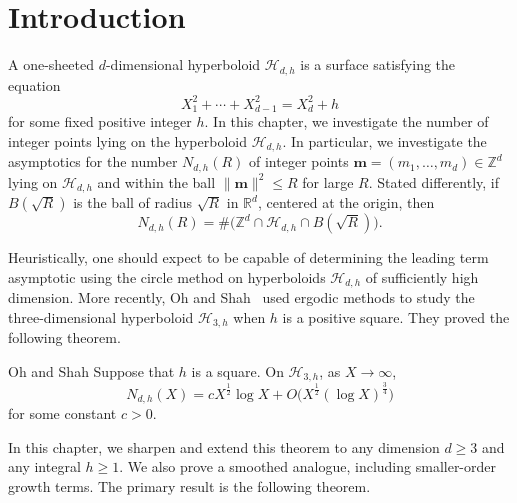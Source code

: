 

\section{Introduction}\label{sec:hyperboloid_introduction}



A one-sheeted $d$-dimensional hyperboloid $\mathcal{H}_{d,h}$ is a surface satisfying the
equation
\begin{equation}
  X_1^2 + \cdots + X_{d-1}^2 = X_d^2 + h
\end{equation}
for some fixed positive integer $h$.
In this chapter, we investigate the number of integer points lying on the hyperboloid
$\mathcal{H}_{d,h}$.
In particular, we investigate the asymptotics for the number $N_{d,h}(R)$ of integer
points $\bm{m} = (m_1, \ldots, m_d) \in \mathbb{Z}^d$ lying on $\mathcal{H}_{d,h}$ and
within the ball $\| \bm{m} \|^2 \leq R$ for large $R$.
Stated differently, if $B(\sqrt{R})$ is the ball of radius $\sqrt R$ in $\mathbb{R}^d$,
centered at the origin, then
\begin{equation}
  N_{d,h}(R) = \# \big(\mathbb{Z}^d \cap \mathcal{H}_{d,h} \cap B(\sqrt{R})\big).
\end{equation}


Heuristically, one should expect to be capable of determining the leading term asymptotic
using the circle method on hyperboloids $\mathcal{H}_{d,h}$ of sufficiently high
dimension.
More recently, Oh and Shah~\cite{ohshah2014} used ergodic methods to study the
three-dimensional hyperboloid $\mathcal{H}_{3,h}$ when $h$ is a positive square.
They proved the following theorem.
\begin{theorem}{Oh and Shah}
  Suppose that $h$ is a square.
  On $\mathcal{H}_{3,h}$, as $X \to \infty$,
  \begin{equation}
    N_{d,h}(X) = c X^{\frac{1}{2}}\log X + O \big( X^{\frac{1}{2}} (\log X)^{\frac{3}{4}}
    \big)
  \end{equation}
  for some constant $c > 0$.
\end{theorem}


In this chapter, we sharpen and extend this theorem to any dimension $d \geq 3$ and any
integral $h \geq 1$.
We also prove a smoothed analogue, including smaller-order growth terms.
The primary result is the following theorem.


